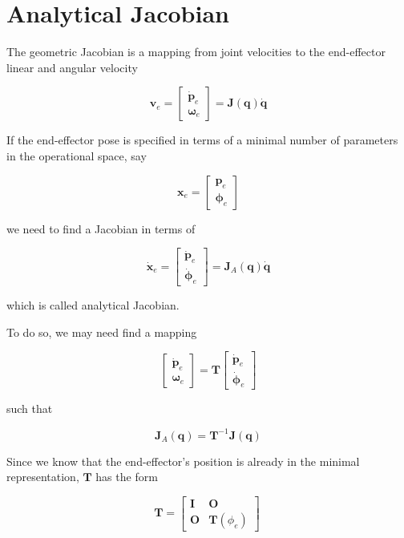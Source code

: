 \documentclass[10pt]{article}
\begin{document}
\section{Analytical Jacobian}
The  geometric Jacobian is a mapping from  joint velocities to the end-effector linear and angular velocity

$$
    \boldsymbol{v}_{e}=\left[\begin{array}{c}
\dot{\boldsymbol{p}}_{e} \\
\boldsymbol{\omega}_{e}
\end{array}\right]=\boldsymbol{J}(\boldsymbol{q}) \dot{\boldsymbol{q}}
$$


If the end-effector pose is specified in terms of a minimal number of parameters in the operational space, say

$$
{\boldsymbol{x}}_{e}=\left[\begin{array}{c}
{\boldsymbol{p}}_{e} \\
{\boldsymbol{\phi}}_{e}
\end{array}\right]
$$

we need to find a Jacobian in terms of

$$
    \dot{\boldsymbol{x}}_{e}=\left[\begin{array}{c}
\dot{\boldsymbol{p}}_{e} \\
\dot{\boldsymbol{\phi}}_{e}
\end{array}\right]=\boldsymbol{J}_{A}(\boldsymbol{q}) \dot{\boldsymbol{q}}$$

which is called analytical Jacobian.


To do so, we may need find a mapping

$$
\left[\begin{array}{c}
\dot{\boldsymbol{p}}_{e} \\
\boldsymbol{\omega}_{e}
\end{array}\right] =  \boldsymbol{T}\left[\begin{array}{c}
\dot{\boldsymbol{p}}_{e} \\
\dot{\boldsymbol{\phi}}_{e}
\end{array}\right]$$

such that 

$$
\boldsymbol{J}_{A}(\boldsymbol{q}) = \boldsymbol{T}^{-1} \boldsymbol{J}(\boldsymbol{q})
$$

Since we know that the end-effector's position is already in the minimal representation, $\boldsymbol{T}$ has the form

$$
\boldsymbol{T}=
\left[\begin{array}{cc}
\boldsymbol{I} & \boldsymbol{O} \\
\boldsymbol{O} & \boldsymbol{T}\left(\phi_{e}\right)
\end{array}\right] \
$$
\end{document}
